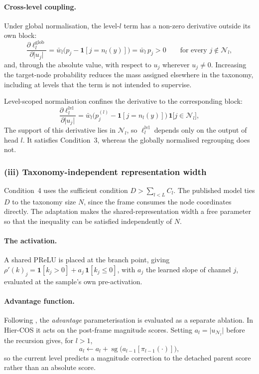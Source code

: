 \paragraph{Cross-level coupling.}
Under global normalisation, the level-$l$ term has a non-zero derivative outside
its own block:
\[
\frac{\partial \ell^{\mathrm{glob}}_l}{\partial \lvert u_j\rvert}
=\bar w_l\big(p_j-\mathbf{1}[j=n_l(y)]\big)
=\bar w_l\,p_j>0
\qquad\text{for every } j\notin\mathcal{N}_l ,
\]
and, through the absolute value, with respect to $u_j$ wherever $u_j\neq0$.
Increasing the target-node probability reduces the mass assigned elsewhere in
the taxonomy, including at levels that the term is not intended to supervise.

Level-scoped normalisation confines the derivative to the corresponding block:
\[
\frac{\partial \ell^{\mathrm{lvl}}_l}{\partial \lvert u_j\rvert}
=\bar w_l\big(p^{(l)}_j-\mathbf{1}[j=n_l(y)]\big)\,\mathbf{1}\big[j\in\mathcal{N}_l\big] ,
\]
The support of this derivative lies in $\mathcal{N}_l$, so
$\ell^{\mathrm{lvl}}_l$ depends only on the output of head $l$. It satisfies
Condition~3, whereas the globally normalised regrouping does not.

\subsubsection{(iii) Taxonomy-independent representation width}

Condition~4 uses the sufficient condition $D>\sum_{l<L}C_l$. The published
model ties $D$ to the taxonomy size $N$, since the frame consumes the node
coordinates directly. The adaptation makes the shared-representation width a
free parameter so that the inequality can be satisfied independently of $N$.

\paragraph{The activation.} A shared PReLU is placed at the branch point, giving
$\rho'(k)_j=\mathbf{1}[k_j>0]+a_j\,\mathbf{1}[k_j\le 0]$, with $a_j$ the learned
slope of channel $j$, evaluated at the sample's own pre-activation.

\paragraph{Advantage function.} Following \cite{fiaschi2024informed}, the
\emph{advantage} parameterisation is evaluated as a separate ablation. In
Hier-COS it acts on the post-frame magnitude scores. Setting
$a_l=\lvert u_{\mathcal{N}_l}\rvert$ before the recursion gives, for $l>1$,
\[
a_l \leftarrow a_l
+\operatorname{sg}\!\big(a_{l-1}[\pi_{l-1}(\cdot)]\big),
\]
so the current level predicts a magnitude correction to the detached parent
score rather than an absolute score.

